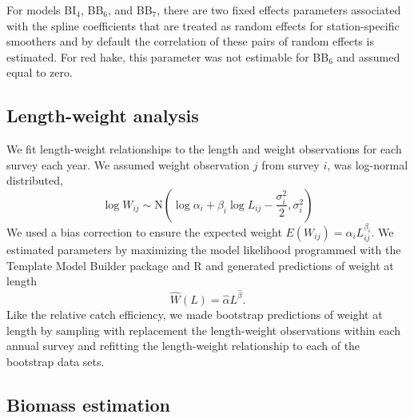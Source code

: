\documentclass[
  12pt,
]{article}
\begin{document}
For models BI\(_4\), BB\(_6\), and BB\(_7\), there are two fixed effects
parameters associated with the spline coefficients that are treated as
random effects for station-specific smoothers and by default the
correlation of these pairs of random effects is estimated. For red hake,
this parameter was not estimable for BB\(_6\) and assumed equal to zero.

\hypertarget{length-weight-analysis}{%
\subsection{Length-weight analysis}\label{length-weight-analysis}}

We fit length-weight relationships to the length and weight observations
for each survey each year. We assumed weight observation \(j\) from
survey \(i\), was log-normal distributed, \begin{equation}\label{wal}
 \log W_{ij} \sim \text{N}\left(\log \alpha_i + \beta_i \log L_{ij} - \frac{\sigma_i^2}{2}, \sigma_i^2\right)
\end{equation} We used a bias correction to ensure the expected weight
\(E(W_{ij})= \alpha_i L_{ij}^{\beta_i}\). We estimated parameters by
maximizing the model likelihood programmed with the Template Model
Builder package \citep{kristensenetal16} and R \citep{R19} and generated
predictions of weight at length \begin{equation}\label{predwal}
\widehat W(L) = \widehat \alpha L^{\widehat \beta}.
\end{equation} Like the relative catch efficiency, we made bootstrap
predictions of weight at length by sampling with replacement the
length-weight observations within each annual survey and refitting the
length-weight relationship to each of the bootstrap data sets.

\hypertarget{biomass-estimation}{%
\subsection{Biomass estimation}\label{biomass-estimation}}
\end{document}
